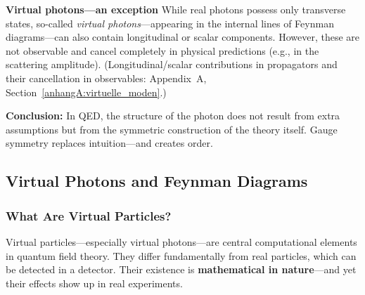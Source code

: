 \textbf{Virtual photons—an exception}
While real photons possess only transverse states, so-called \emph{virtual photons}—appearing in the internal lines of Feynman diagrams—can also contain longitudinal or scalar components.
However, these are not observable and cancel completely in physical predictions (e.g., in the scattering amplitude).
(Longitudinal/scalar contributions in propagators and their cancellation in observables: Appendix~A, Section~\ref{anhangA:virtuelle_moden}.)

\textbf{Conclusion:}
In QED, the structure of the photon does not result from extra assumptions but from the symmetric construction of the theory itself. Gauge symmetry replaces intuition—and creates order.

\subsection{Virtual Photons and Feynman Diagrams}

\subsubsection{What Are Virtual Particles?}

Virtual particles—especially virtual photons—are central computational elements in quantum field theory.
They differ fundamentally from real particles, which can be detected in a detector.
Their existence is \textbf{mathematical in nature}—and yet their effects show up in real experiments.

